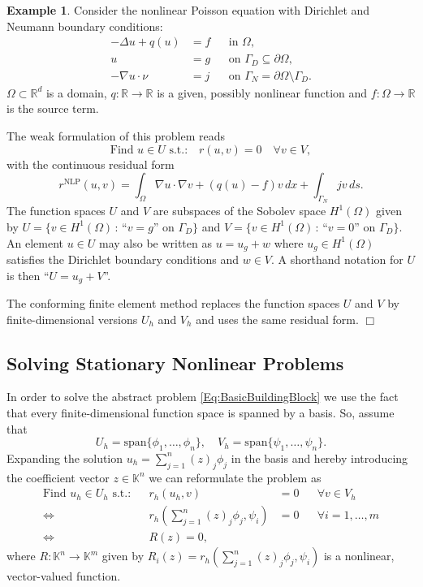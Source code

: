 \documentclass[a4paper,12pt]{article}
\theoremstyle{definition}
\newtheorem{exm}{Example}
\begin{document}
\begin{exm} \label{Exm:NonlinearPoisson}
Consider the nonlinear Poisson equation with
Dirichlet and Neumann boundary conditions:
\begin{align*}
-\Delta u + q(u) &= f &&\text{in $\Omega$},\\
u &= g &&\text{on $\Gamma_D\subseteq\partial\Omega$},\\
-\nabla u\cdot \nu &= j &&\text{on $\Gamma_N=\partial\Omega\setminus\Gamma_D$}.
\end{align*}
$\Omega\subset\mathbb{R}^d$ is a domain, $q:\mathbb{R}\to\mathbb{R}$ is a given, possibly
nonlinear function and $f: \Omega\to\mathbb{R}$ is the source term.

The weak formulation of this problem reads
\begin{equation*}
\text{Find $u\in U$ s.t.:} \quad r(u,v)=0 \quad \forall v\in V,
\end{equation*}
with the continuous residual form
\begin{equation*}
r^{\text{NLP}}(u,v) = \int_\Omega \nabla u \cdot \nabla v + (q(u)-f)v\,dx + \int_{\Gamma_N} jv\,ds .
\end{equation*}
The function spaces $U$ and $V$ are subspaces of the Sobolev space $H^1(\Omega)$ given by
$U= \{v\in H^1(\Omega) \,:\, \text{``$v=g$'' on $\Gamma_D$}\}$
and $V= \{v\in H^1(\Omega) \,:\, \text{``$v=0$'' on $\Gamma_D$}\}$. An element $u\in U$ may
also be written as $u=u_g + w$ where $u_g\in H^1(\Omega)$ satisfies the Dirichlet boundary
conditions and $w\in V$. A shorthand notation for $U$ is then ``$U=u_g+V$''.

The conforming finite element method \cite{BrennerScott,Elman2005,Ern}
replaces the function spaces
$U$ and $V$ by finite-dimensional versions $U_h$ and $V_h$ and uses the same residual form.
\hfill$\Box$
\end{exm}

\subsection*{Solving Stationary Nonlinear Problems}

In order to solve the abstract problem \eqref{Eq:BasicBuildingBlock} we use the fact that
every finite-dimensional function space is spanned by a basis. So, assume that
\begin{equation*}
U_h=\text{span}\{\phi_1,\ldots,\phi_n\}, \quad V_h=\text{span}\{\psi_1,\ldots,\psi_n\} .
\end{equation*}
Expanding the solution $u_h=\sum_{j=1}^n (z)_j\phi_j$ in the basis and
hereby introducing the coefficient vector $z\in\mathbb{K}^n$ we can
reformulate the problem as
\begin{align*}
\text{Find $u_h\in U_h$ s.t.:} && r_h(u_h,v)&=0 && \forall v\in V_h\\
\Leftrightarrow{} && r_h\left(\sum_{j=1}^n (z)_j\phi_j,\psi_i\right) &= 0 &&\forall i=1,\ldots,m\\
\Leftrightarrow{} && R(z) = 0,
\end{align*}
where $R: \mathbb{K}^n \to \mathbb{K}^m$ given by 
$R_i(z) = r_h\left(\sum_{j=1}^n (z)_j\phi_j,\psi_i\right)$ is a nonlinear, vector-valued function.
\end{document}
